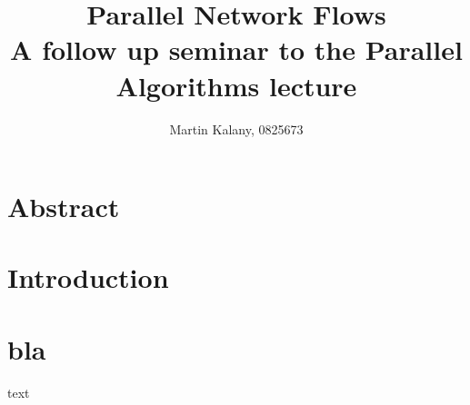 \documentclass[a4paper,12pt, twocolumn]{article}
\title{Parallel Network Flows \\
    A follow up seminar to the Parallel Algorithms lecture}
\author{Martin Kalany, 0825673}
\begin{document}
\maketitle

\section{Abstract}
\section{Introduction}


\section{bla}
text \cite{ahuja93} \cite{papa95} \cite{yossi81} \cite{vishkin92} \cite{goldberg89} \cite{goldberg91} \cite{goldberg98} \cite{johnson87} \cite{schieber89} \cite{cherivan89} 

\printbibliography
\end{document}
